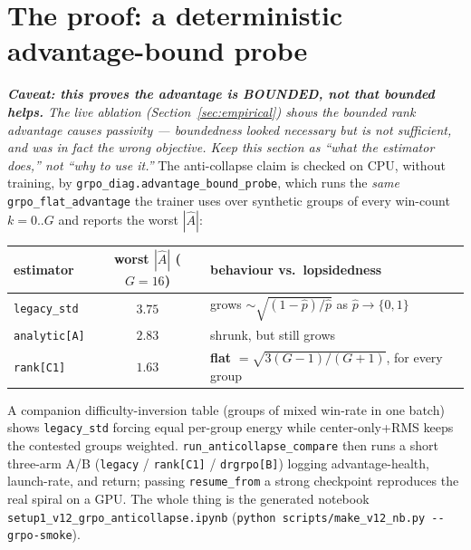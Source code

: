 \documentclass[11pt]{article}
\newcommand{\Adv}{\widehat{A}}
\newcommand{\cd}[1]{\texttt{#1}}
\begin{document}
\section{The proof: a deterministic advantage-bound probe}\label{sec:proof}
\emph{\textbf{Caveat: this proves the advantage is BOUNDED, not that bounded helps.} The live ablation
(Section~\ref{sec:empirical}) shows the bounded rank advantage \emph{causes} passivity --- boundedness looked
necessary but is not sufficient, and was in fact the wrong objective. Keep this section as ``what the estimator
does,'' not ``why to use it.''}
The anti-collapse claim is checked on CPU, without training, by \cd{grpo\_diag.advantage\_bound\_probe},
which runs the \emph{same} \cd{grpo\_flat\_advantage} the trainer uses over synthetic groups of every
win-count $k=0..G$ and reports the worst $|\Adv|$:
\begin{center}\small
\begin{tabular}{@{}lcl@{}}
\toprule
estimator & worst $|\Adv|$ ($G=16$) & behaviour vs.\ lopsidedness \\
\midrule
\cd{legacy\_std} & $3.75$ & grows $\sim\sqrt{(1-\hat p)/\hat p}$ as $\hat p\to\{0,1\}$ \\
\cd{analytic[A]} & $2.83$ & shrunk, but still grows \\
\cd{rank[C1]}    & $\mathbf{1.63}$ & \textbf{flat} $=\sqrt{3(G-1)/(G+1)}$, for every group \\
\bottomrule
\end{tabular}
\end{center}
A companion difficulty-inversion table (groups of mixed win-rate in one batch) shows \cd{legacy\_std}
forcing equal per-group energy while center-only+RMS keeps the contested groups weighted.
\cd{run\_anticollapse\_compare} then runs a short three-arm A/B (\cd{legacy} / \cd{rank[C1]} /
\cd{drgrpo[B]}) logging advantage-health, launch-rate, and return; passing \cd{resume\_from} a strong
checkpoint reproduces the real spiral on a GPU. The whole thing is the generated notebook
\cd{setup1\_v12\_grpo\_anticollapse.ipynb} (\cd{python scripts/make\_v12\_nb.py -{}-grpo-smoke}).

\end{document}
